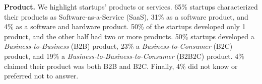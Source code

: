 \documentclass[runningheads]{llncs}
\begin{document}
\textbf{Product.} We highlight startups' products or services. 65\% startups characterized their products as Software-as-a-Service (SaaS), 31\% as a software product, and 4\% as a software and hardware product. 50\% of the startups developed only 1 product, and the other half had two or more products. 50\% startups developed a \textit{Business-to-Business} (B2B) product, 23\% a \textit{Business-to-Consumer} (B2C) product, and 19\% a \textit{Business-to-Business-to-Consumer} (B2B2C) product. 4\% claimed their product was both B2B and B2C. Finally, 4\% did not know or preferred not to answer. %
{
}
\end{document}

